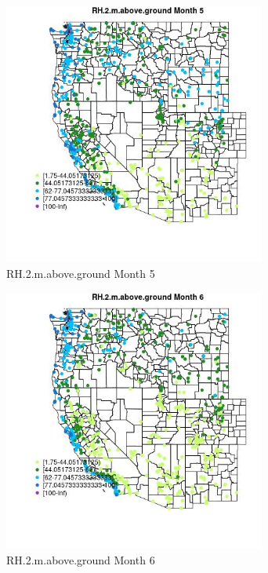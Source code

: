 \begin{figure} 
\centering  
\includegraphics[width=0.77\textwidth]{Code_Outputs/Report_ML_input_PM25_Step4_part_e_de_duplicated_aves_compiled_2019-05-21wNAs_MapObsMo5RH2maboveground.jpg} 
\caption{\label{fig:Report_ML_input_PM25_Step4_part_e_de_duplicated_aves_compiled_2019-05-21wNAsMapObsMo5RH2maboveground}RH.2.m.above.ground Month 5} 
\end{figure} 
 

\begin{figure} 
\centering  
\includegraphics[width=0.77\textwidth]{Code_Outputs/Report_ML_input_PM25_Step4_part_e_de_duplicated_aves_compiled_2019-05-21wNAs_MapObsMo6RH2maboveground.jpg} 
\caption{\label{fig:Report_ML_input_PM25_Step4_part_e_de_duplicated_aves_compiled_2019-05-21wNAsMapObsMo6RH2maboveground}RH.2.m.above.ground Month 6} 
\end{figure} 
 

